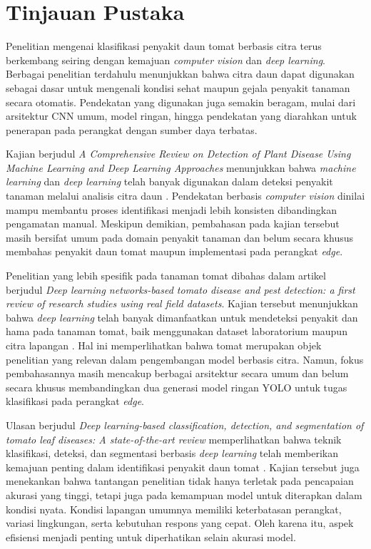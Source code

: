 \section{Tinjauan Pustaka}
\begin{sectioncontent}
    \hspace{\parindent}Penelitian mengenai klasifikasi penyakit daun tomat berbasis citra terus berkembang seiring dengan kemajuan \textit{computer vision} dan \textit{deep learning}. Berbagai penelitian terdahulu menunjukkan bahwa citra daun dapat digunakan sebagai dasar untuk mengenali kondisi sehat maupun gejala penyakit tanaman secara otomatis. Pendekatan yang digunakan juga semakin beragam, mulai dari arsitektur CNN umum, model ringan, hingga pendekatan yang diarahkan untuk penerapan pada perangkat dengan sumber daya terbatas.

    Kajian berjudul \textit{A Comprehensive Review on Detection of Plant Disease Using Machine Learning and Deep Learning Approaches} menunjukkan bahwa \textit{machine learning} dan \textit{deep learning} telah banyak digunakan dalam deteksi penyakit tanaman melalui analisis citra daun \citep[hlm. 1--2]{jackulin2022plantreview}. Pendekatan berbasis \textit{computer vision} dinilai mampu membantu proses identifikasi menjadi lebih konsisten dibandingkan pengamatan manual. Meskipun demikian, pembahasan pada kajian tersebut masih bersifat umum pada domain penyakit tanaman dan belum secara khusus membahas penyakit daun tomat maupun implementasi pada perangkat \textit{edge}.

    Penelitian yang lebih spesifik pada tanaman tomat dibahas dalam artikel berjudul \textit{Deep learning networks-based tomato disease and pest detection: a first review of research studies using real field datasets}. Kajian tersebut menunjukkan bahwa \textit{deep learning} telah banyak dimanfaatkan untuk mendeteksi penyakit dan hama pada tanaman tomat, baik menggunakan dataset laboratorium maupun citra lapangan \citep[hlm. 1--3]{jelali2024tomatoreview}. Hal ini memperlihatkan bahwa tomat merupakan objek penelitian yang relevan dalam pengembangan model berbasis citra. Namun, fokus pembahasannya masih mencakup berbagai arsitektur secara umum dan belum secara khusus membandingkan dua generasi model ringan YOLO untuk tugas klasifikasi pada perangkat \textit{edge}.

    Ulasan berjudul \textit{Deep learning-based classification, detection, and segmentation of tomato leaf diseases: A state-of-the-art review} memperlihatkan bahwa teknik klasifikasi, deteksi, dan segmentasi berbasis \textit{deep learning} telah memberikan kemajuan penting dalam identifikasi penyakit daun tomat \citep[hlm. 192--193 dan 199--200]{das2025tomatoreview}. Kajian tersebut juga menekankan bahwa tantangan penelitian tidak hanya terletak pada pencapaian akurasi yang tinggi, tetapi juga pada kemampuan model untuk diterapkan dalam kondisi nyata. Kondisi lapangan umumnya memiliki keterbatasan perangkat, variasi lingkungan, serta kebutuhan respons yang cepat. Oleh karena itu, aspek efisiensi menjadi penting untuk diperhatikan selain akurasi model.


\end{sectioncontent}
